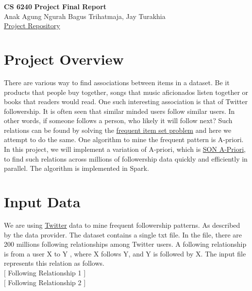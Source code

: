 \documentclass[11pt]{article}
\begin{document}
\thispagestyle{empty}
\setlength{\parindent}{0pt}
\setlength{\parskip}{1.8ex}
\lstset{language=Scala}
\newcommand{\hs}{\hspace{.1in}}

\begin{center}
    \Large{\bf CS 6240}
    \Large{\bf Project Final Report\\}
    \Large{Anak Agung Ngurah Bagus Trihatmaja, Jay Turakhia\\}
    \href{https://github.ccs.neu.edu/prdx/CS6240-Project}{Project Repository}  \\
\end{center}
\medskip

\section{Project Overview}
There are various way to find associations between items in a dataset.
Be it products that people buy together, songs that music aficionados listen together or books that readers would read.
One such interesting association is that of Twitter followership.
It is often seen that similar minded users follow similar users.
In other words, if someone follows a person, who likely it will follow next?
Such relations can be found by solving the \href{https://en.wikipedia.org/wiki/Association_rule_learning}{frequent item set problem} and here we attempt to do the same.
One algorithm to mine the frequent pattern is A-priori.
In this project, we will implement a variation of A-priori, which is \href{http://www.vldb.org/conf/1995/P432.PDF}{SON A-Priori}, to find such relations across millions of followership data quickly and efficiently in parallel.
The algorithm is implemented in Spark.

\section{Input Data}
We are using \href{https://wiki.illinois.edu//wiki/display/forward/Dataset-UDI-TwitterCrawl-Aug2012}{Twitter} data to mine frequent followership patterns.
As described by the data provider.
The dataset contains a single txt file.
In the file, there are 200 millions following relationships among Twitter users.
A following relationship is from a user X to Y , where X follows Y, and Y is followed by X.
The input file represents this relation as follows.\\
$\big[$ Following Relationship 1 $\big]$\\
$\big[$ Following Relationship 2 $\big]$
\end{document}
